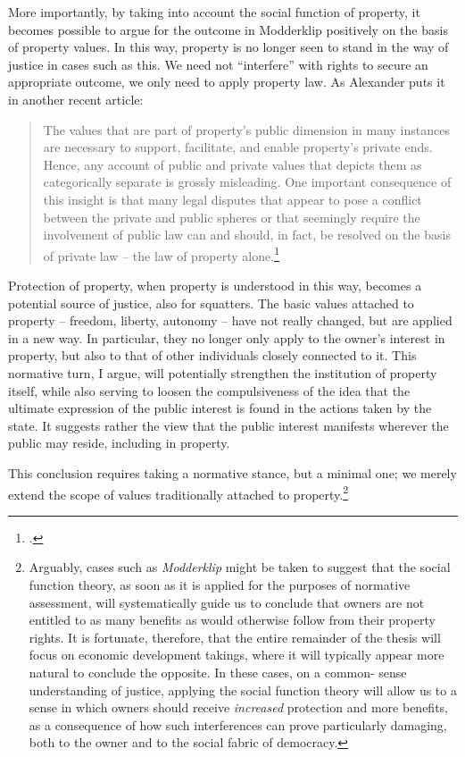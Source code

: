 More importantly, by taking into account the social function of property, it becomes possible to argue for the outcome in Modderklip positively on the basis of property values. In this way, property is no longer seen to stand in the way of justice in cases such as this. We need not ``interfere'' with rights to secure an appropriate outcome, we only need to apply property law. As Alexander puts it in another recent article: 

\begin{quote} The values that are
part of property's public dimension in many instances are necessary
to support, facilitate, and enable property's private ends.
Hence, any account of public and private values that depicts them as categorically
separate is grossly misleading. One important consequence of this
insight is that many legal disputes that appear to pose a conflict between
the private and public spheres or that seemingly
require the involvement of public law can and
should, in fact, be resolved on the basis of private law -- the law
of property alone.\footcite[1295-1296]{alexander14} \end{quote}

Protection of property, when property is understood in this way, becomes a potential source of justice, also for squatters. The basic values attached to property -- freedom, liberty, autonomy -- have not really changed, but are applied in a new way. In particular, they no longer only apply to the owner's interest in property, but also to that of other individuals closely connected to it. This normative turn, I argue, will potentially strengthen the institution of property itself, while also serving to loosen the compulsiveness of the idea that the ultimate expression of the public interest is found in the actions taken by the state. It suggests rather the view that the public interest manifests wherever the public may reside, including in property. 

This conclusion requires taking a normative stance, but a minimal one; we merely extend the scope of values traditionally attached to property.\footnote{Arguably, cases such as {\it Modderklip} might be taken to suggest that the social function theory, as soon as it is applied for the purposes of normative assessment, will systematically guide us to conclude that owners are not entitled to as many benefits as would otherwise follow from their property rights. It is fortunate, therefore, that the entire remainder of the thesis will focus on economic development takings, where it will typically appear more natural to conclude the opposite. In these cases, on a common- sense understanding of justice, applying the social function theory will allow us to  a sense in which owners should receive {\it increased} protection and more benefits, as a consequence of how such interferences can prove particularly damaging, both to the owner and to the social fabric of democracy.} 

